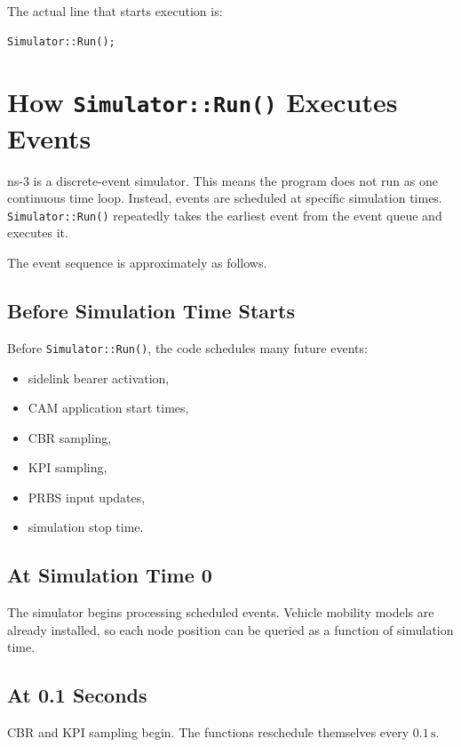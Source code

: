 \documentclass[11pt,a4paper]{article}
\begin{document}
The actual line that starts execution is:

\begin{lstlisting}[style=cppstyle]
Simulator::Run();
\end{lstlisting}

\section{How \texttt{Simulator::Run()} Executes Events}

ns-3 is a discrete-event simulator. This means the program does not run as one continuous time loop. Instead, events are scheduled at specific simulation times. \texttt{Simulator::Run()} repeatedly takes the earliest event from the event queue and executes it.

The event sequence is approximately as follows.

\subsection{Before Simulation Time Starts}

Before \texttt{Simulator::Run()}, the code schedules many future events:

\begin{itemize}
    \item sidelink bearer activation,
    \item CAM application start times,
    \item CBR sampling,
    \item KPI sampling,
    \item PRBS input updates,
    \item simulation stop time.
\end{itemize}

\subsection{At Simulation Time 0}

The simulator begins processing scheduled events. Vehicle mobility models are already installed, so each node position can be queried as a function of simulation time.

\subsection{At 0.1 Seconds}

CBR and KPI sampling begin. The functions reschedule themselves every \(0.1\,\mathrm{s}\).
\end{document}
